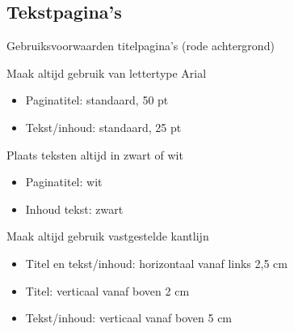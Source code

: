 \documentclass[department=none, notes={show notes}, slidesperpage=4, official=true, handout]{beamerruhuisstijl}
\begin{document}
\subsection{Tekstpagina's}
\begin{frame}{Gebruiksvoorwaarden titelpagina's (rode achtergrond)}
	\begin{block}{Maak altijd gebruik van lettertype Arial}
    	\begin{itemize}
        	\item Paginatitel: standaard, 50 pt
            \item Tekst/inhoud: standaard, 25 pt
        \end{itemize}
    \end{block}
    
    \begin{block}{Plaats teksten altijd in zwart of wit}
    	\begin{itemize}
        	\item Paginatitel: wit
            \item Inhoud tekst: zwart
        \end{itemize}
    \end{block}
    
    \begin{block}{Maak altijd gebruik vastgestelde kantlijn}
    	\begin{itemize}
        	\item Titel en tekst/inhoud: horizontaal vanaf links 2,5 cm
            \item Titel: verticaal vanaf boven 2 cm
            \item Tekst/inhoud: verticaal vanaf boven 5 cm
        \end{itemize}
    \end{block}
\end{frame}
\end{document}

